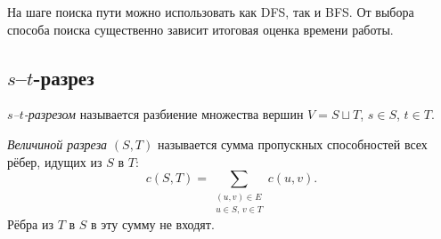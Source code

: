 \begin{Remark}{}{}
	На шаге поиска пути можно использовать как DFS, так и BFS. От выбора способа поиска существенно зависит итоговая оценка времени работы.
\end{Remark}

\subsection{\texorpdfstring{$s$--$t$}{s-t}-разрез}

\begin{Definition}{}{}
	\emph{$s$--$t$-разрезом} называется разбиение множества вершин $V=S \sqcup T$, $s\in S$, $t\in T$.
\end{Definition}

\begin{Definition}{}{}
	\emph{Величиной разреза} $(S,T)$ называется сумма пропускных способностей всех рёбер, идущих из $S$ в $T$:
	\[
	c(S,T)=\sum_{\substack{(u,v)\in E\\ u\in S,\, v\in T}} c(u,v).
	\]
	Рёбра из $T$ в $S$ в эту сумму не входят.
\end{Definition}

